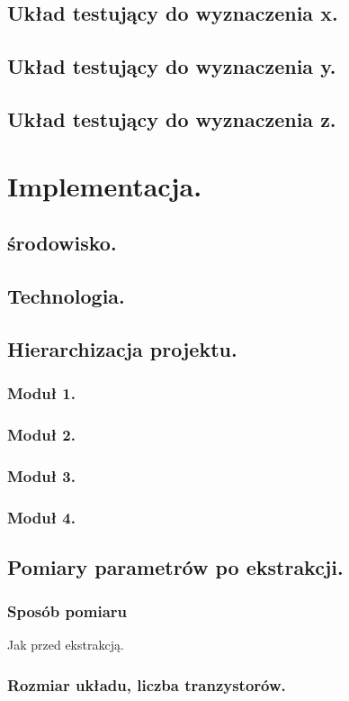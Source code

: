 \documentclass[10pt,a4paper]{report}
\begin{document}
	\section{Układ testujący do wyznaczenia x.}
	\section{Układ testujący do wyznaczenia y.}
	\section{Układ testujący do wyznaczenia z.}
	
	\chapter{Implementacja.}
	\section{środowisko.}
	\section{Technologia.}
	\section{Hierarchizacja projektu.}
	\subsection{Moduł 1.}
	\subsection{Moduł 2.}
	\subsection{Moduł 3.}
	\subsection{Moduł 4.}
	
	\section{Pomiary parametrów po ekstrakcji.}
	\subsection{Sposób pomiaru}
	Jak przed ekstrakcją.
	\subsection{Rozmiar układu, liczba tranzystorów.}
\end{document}

